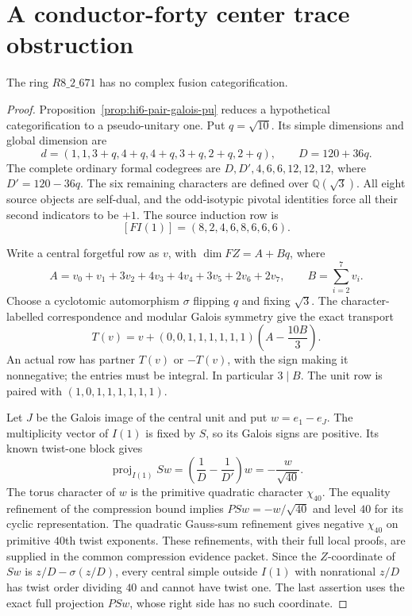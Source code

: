 \section{A conductor-forty center trace obstruction}
\label{sec:r671-center-trace}

\begin{theorem}\label{thm:r671-center-trace}
The ring $R8\_2\_671$ has no complex fusion categorification.
\end{theorem}
\begin{proof}
Proposition~\ref{prop:hi6-pair-galois-pu} reduces a hypothetical
categorification to a pseudo-unitary one. Put $q=\sqrt{10}$. Its simple
dimensions and global dimension are
\[
 d=(1,1,3+q,4+q,4+q,3+q,2+q,2+q),\qquad D=120+36q.
\]
The complete ordinary formal codegrees are
$D,D',4,6,6,12,12,12$, where $D'=120-36q$.
The six remaining characters are defined over $\mathbb Q(\sqrt3)$.
All eight source objects are self-dual, and the odd-isotypic pivotal
identities force all their second indicators to be $+1$.
The source induction row is
\[
 [FI(1)]=(8,2,4,6,8,6,6,6).
\]

Write a central forgetful row as $v$, with
$\dim FZ=A+Bq$, where
\[
 A=v_0+v_1+3v_2+4v_3+4v_4+3v_5+2v_6+2v_7,
 \qquad B=\sum_{i=2}^7v_i.
\]
Choose a cyclotomic automorphism $\sigma$ flipping $q$ and fixing
$\sqrt3$. The character-labelled correspondence
\cite[Example~2.9 and Theorem~2.13]{OstrikPiv3} and modular Galois
symmetry give the exact transport
\begin{equation}
 T(v)=v+(0,0,1,1,1,1,1,1)\left(A-\frac{10B}{3}\right).
 \label{eq:r671-transport}
\end{equation}
An actual row has partner $T(v)$ or $-T(v)$, with the sign making it
nonnegative; the entries must be integral. In particular $3\mid B$.
The unit row is paired with $(1,0,1,1,1,1,1,1)$.

Let $J$ be the Galois image of the central unit and put
$w=e_1-e_J$. The multiplicity vector of $I(1)$ is fixed by $S$, so
its Galois signs are positive. Its known twist-one block gives
\[
 \operatorname{proj}_{I(1)}Sw
 =\left(\frac1D-\frac1{D'}\right)w
 =-\frac{w}{\sqrt{40}}.
\]
The torus character of $w$ is the primitive quadratic character
$\chi_{40}$. The equality refinement of the compression bound
\cite[Lemma~4.1]{SchDimensionBlock} implies
$PSw=-w/\sqrt{40}$ and level $40$ for its cyclic representation.
The quadratic Gauss-sum refinement gives negative $\chi_{40}$ on
primitive $40$th twist exponents. These refinements, with their full
local proofs, are supplied in the common compression evidence packet.
Since the $Z$-coordinate of $Sw$ is
$z/D-\sigma(z/D)$, every central simple outside $I(1)$ with
nonrational $z/D$ has twist order dividing $40$ and cannot have twist
one. The last assertion uses the exact full projection $PSw$, whose
right side has no such coordinate.


\end{proof}
